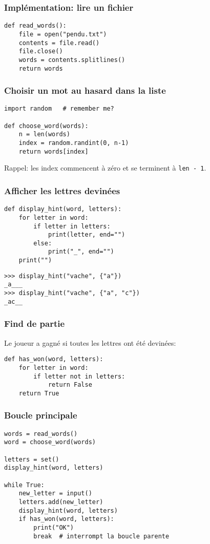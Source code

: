 \documentclass{beamer}
\begin{document}
\begin{frame}[fragile]
  \frametitle{Implémentation: lire un fichier}

\begin{lstlisting}
def read_words():
    file = open("pendu.txt")
    contents = file.read()
    file.close()
    words = contents.splitlines()
    return words
\end{lstlisting}

\end{frame}

\begin{frame}[fragile]
  \frametitle{Choisir un mot au hasard dans la liste}
\begin{lstlisting}
import random   # remember me?

def choose_word(words):
    n = len(words)
    index = random.randint(0, n-1)
    return words[index]
\end{lstlisting}

Rappel: les index commencent à zéro et se terminent à \texttt{len - 1}.

\end{frame}

\begin{frame}[fragile]
  \frametitle{Afficher les lettres devinées}

\begin{lstlisting}
def display_hint(word, letters):
    for letter in word:
        if letter in letters:
            print(letter, end="")
        else:
            print("_", end="")
    print("")
\end{lstlisting}

\begin{lstlisting}
>>> display_hint("vache", {"a"})
_a___
>>> display_hint("vache", {"a", "c"})
_ac__
\end{lstlisting}
\end{frame}

\begin{frame}[fragile]
  \frametitle{Find de partie}

Le joueur a gagné si toutes les lettres ont
été devinées:

\vfill

\begin{lstlisting}
def has_won(word, letters):
    for letter in word:
        if letter not in letters:
            return False
    return True
\end{lstlisting}
\end{frame}


\begin{frame}[fragile]
  \frametitle{Boucle principale}
\begin{lstlisting}
words = read_words()
word = choose_word(words)

letters = set()
display_hint(word, letters)

while True:
    new_letter = input()
    letters.add(new_letter)
    display_hint(word, letters)
    if has_won(word, letters):
        print("OK")
        break  # interrompt la boucle parente
\end{lstlisting}
\end{frame}
\end{document}
